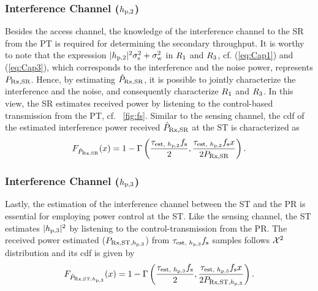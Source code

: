 \subsubsection*{Interference Channel ($h_{\text{p,2}}$)}
Besides the access channel, the knowledge of the interference channel to the SR from the PT is required for determining the secondary throughput. It is worthy to note that the expression $|h_{\text{p,2}}|^2 \sigma^2_{\text{s}} + \sigma^2_{\text{w}}$ in $R_{\text{1}}$ and $R_{\text{3}}$, cf. (\ref{eq:Cap1}) and (\ref{eq:Cap3}), which corresponds to the interference and the noise power, represents $P_{\text{Rx,SR}}$. Hence, by estimating $\hat{P}_{\text{Rx,SR}}$, it is possible to jointly characterize the interference and the noise, and consequently characterize $R_{\text{1}}$ and $R_{\text{3}}$.  
In this view, the SR estimates received power by listening to the control-based transmission from the PT, cf. \figurename~\ref{fig:fs}. Similar to the sensing channel, the cdf of the estimated interference power received $\hat{P}_{\text{Rx,SR}}$ at the ST is characterized as
\begin{align}
F_{\hat{P}_{\text{Rx,SR}}}(x) = 1 - \Gamma \left( \frac{\tau_{\text{est, $h_{\text{p,2}}$}} f_{\text{s}}}{2}, \frac{\tau_{\text{est, $h_{\text{p,2}}$}} f_{\text{s}} x}{2 P_{\text{Rx,SR}}} \right) \label{eq:fprcvdsr}.
\end{align}

  

\subsubsection*{Interference Channel ($h_{\text{p,3}}$)}
Lastly, the estimation of the interference channel between the ST and the PR is essential for employing power control at the ST. Like the sensing channel, the ST estimates $|h_{\text{p,3}}|^2$ by listening to the control-transmission from the PR. The received power estimated ($P_{\text{Rx,ST,$h_{\text{p,3}}$}}$) from $\tau_{\text{est, $h_{\text{p,3}}$}} f_{\text{s}}$ samples follows $\cchi2$ distribution and its cdf is given by  
\begin{align}
F_{\hat{P}_{\text{Rx,ST,$h_{\text{p,3}}$}}}(x) = 1 - \Gamma \left( \frac{\tau_{\text{est, $h_{\text{p,3}}$}} f_{\text{s}}}{2}, \frac{\tau_{\text{est, $h_{\text{p,3}}$}} f_{\text{s}} x}{2 P_{\text{Rx,ST,$h_{\text{p,3}}$}}} \right) \label{eq:fprcvdstpr}.
\end{align}

